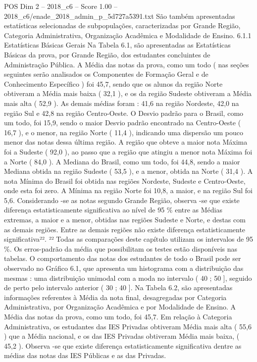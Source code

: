 \begin{textsample}{POS Dim 2 – 2018\_c6 – Score 1.00 – 2018\_c6/enade\_2018\_admin\_p\_5d727a5391.txt}
São também apresentadas estatísticas selecionadas de subpopulações, caracterizadas por Grande Região, Categoria Administrativa, Organização Acadêmica e Modalidade de Ensino. 6.1.1 Estatísticas Básicas Gerais Na Tabela 6.1, são apresentadas as Estatísticas Básicas da prova, por Grande Região, dos estudantes concluintes de Administração Pública.
A Média das notas da prova, como um todo ( nas seções seguintes serão analisados os Componentes de Formação Geral e de Conhecimento Específico ) foi 45,7, sendo que os alunos da região Norte obtiveram a Média mais baixa ( 32,1 ), e os da região Sudeste obtiveram a Média mais alta ( 52,9 ).
As demais médias foram : 41,6 na região Nordeste, 42,0 na região Sul e 42,8 na região Centro-Oeste.
O Desvio padrão para o Brasil, como um todo, foi 15,9, sendo o maior Desvio padrão encontrado na Centro-Oeste ( 16,7 ), e o menor, na região Norte ( 11,4 ), indicando uma dispersão um pouco menor das notas dessa última região.
A região que obteve a maior nota Máxima foi a Sudeste ( 92,0 ), ao passo que a região que atingiu a menor nota Máxima foi a Norte ( 84,0 ).
A Mediana do Brasil, como um todo, foi 44,8, sendo a maior Mediana obtida na região Sudeste ( 53,5 ), e a menor, obtida na Norte ( 31,4 ).
A nota Mínima do Brasil foi obtida nas regiões Nordeste, Sudeste e Centro-Oeste, onde esta foi zero.
A Mínima na região Norte foi 10,8, a maior, e na região Sul foi 5,6.
Considerando -se as notas segundo Grande Região, observa -se que existe diferença estatisticamente significativa ao nível de 95 \% entre as Médias extremas, a maior e a menor, obtidas nas regiões Sudeste e Norte, e destas com as demais regiões.
Entre as demais regiões não existe diferença estatisticamente significativa²². ²² Todas as comparações deste capítulo utilizam os intervalos de 95 \%.
Os erros-padrão da média que possibilitam os testes estão disponíveis nas tabelas.
O comportamento das notas dos estudantes de todo o Brasil pode ser observado no Gráfico 6.1, que apresenta um histograma com a distribuição das mesmas : uma distribuição unimodal com a moda no intervalo ( 40 ; 50 ], seguido de perto pelo intervalo anterior ( 30 ; 40 ].
Na Tabela 6.2, são apresentadas informações referentes à Média da nota final, desagregadas por Categoria Administrativa, por Organização Acadêmica e por Modalidade de Ensino.
A Média das notas da prova, como um todo, foi 45,7.
Em relação à Categoria Administrativa, os estudantes das IES Privadas obtiveram Média mais alta ( 55,6 ) que a Média nacional, e os das IES Privadas obtiveram Média mais baixa, ( 45,2 ).
Observa -se que existe diferença estatisticamente significativa dentre as médias das notas das IES Públicas e as das Privadas.

\end{textsample}

